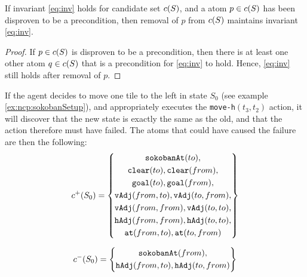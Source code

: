 \documentclass[\master/Master.tex]{subfiles}
\begin{document}
\begin{theorem} \label{th:invHolds}
    If invariant \eqref{eq:inv} holds for candidate set $c(S)$, and a atom $p \in c(S)$ has been disproven to be a precondition, then removal of $p$ from $c(S)$ maintains invariant \eqref{eq:inv}.
\end{theorem}

\begin{proof}
    If $p \in c(S)$ is disproven to be a precondition, then there is at least one other atom $q \in c(S)$ that is a precondition for \eqref{eq:inv} to hold. Hence, \eqref{eq:inv} still holds after removal of $p$.
\end{proof}

\begin{example}
    If the agent decides to move one tile to the left in state $S_0$ (see example \ref{ex:ncp:sokobanSetup}), and appropriately executes the \texttt{move-h}$(t_3, t_2)$ action, it will discover that the new state is exactly the same as the old, and that the action therefore must have failed. The atoms that could have caused the failure are then the following:
    \begin{equation*}
        c^+(S_0) = \left\{
            \begin{gathered}
                \texttt{sokobanAt}(to), \\
                \texttt{clear}(to), \texttt{clear}(from), \\
                \texttt{goal}(to), \texttt{goal}(from), \\
                \texttt{vAdj}(from, to), \texttt{vAdj}(to, from), \\
                \texttt{vAdj}(from, from), \texttt{vAdj}(to, to), \\
                \texttt{hAdj}(from, from), \texttt{hAdj}(to, to), \\
                \texttt{at}(from, to), \texttt{at}(to, from)
            \end{gathered}
        \right\}
    \end{equation*}

    \begin{equation*}
        c^-(S_0) = \left\{
            \begin{gathered}
                \texttt{sokobanAt}(from), \\
                \texttt{hAdj}(from, to), \texttt{hAdj}(to, from)
            \end{gathered}
        \right\}
    \end{equation*}


\end{example}
\end{document}
